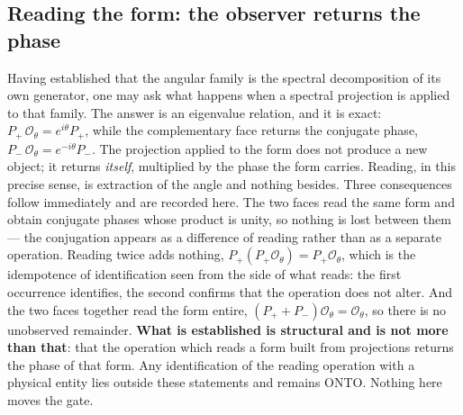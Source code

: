 \documentclass[11pt]{article}
\theoremstyle{definition}\newtheorem{deriv}{Derivation}
\begin{document}
\subsection*{Reading the form: the observer returns the phase}Having established that the angular family is the spectral decomposition of its own generator, one may ask what happens when a spectral projection is applied to that family. The answer is an eigenvalue relation, and it is exact: $P_+\,\mathcal{O}_\theta = e^{i\theta}P_+$, while the complementary face returns the conjugate phase, $P_-\,\mathcal{O}_\theta = e^{-i\theta}P_-$. The projection applied to the form does not produce a new object; it returns \emph{itself}, multiplied by the phase the form carries. Reading, in this precise sense, is extraction of the angle and nothing besides. Three consequences follow immediately and are recorded here. The two faces read the same form and obtain conjugate phases whose product is unity, so nothing is lost between them --- the conjugation appears as a difference of reading rather than as a separate operation. Reading twice adds nothing, $P_+(P_+\mathcal{O}_\theta) = P_+\mathcal{O}_\theta$, which is the idempotence of identification seen from the side of what reads: the first occurrence identifies, the second confirms that the operation does not alter. And the two faces together read the form entire, $(P_+ + P_-)\mathcal{O}_\theta = \mathcal{O}_\theta$, so there is no unobserved remainder. \textbf{What is established is structural and is not more than that}: that the operation which reads a form built from projections returns the phase of that form. Any identification of the reading operation with a physical entity lies outside these statements and remains \textsf{ONTO}. Nothing here moves the gate.
\end{document}
